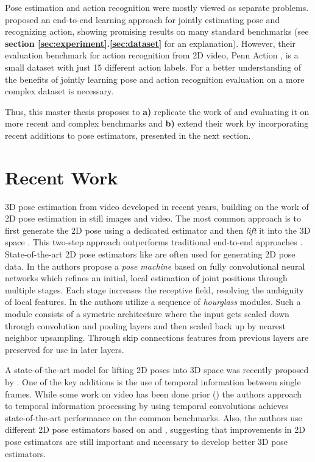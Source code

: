 \documentclass[twoside]{article}
\begin{document}
\begin{multicols}{2}
Pose estimation and action recognition were mostly viewed as separate problems.
\cite{luvizon_2d/3d_2018} proposed an end-to-end learning approach for jointly estimating pose and recognizing action, showing promising results on many standard benchmarks (see \textbf{section \ref{sec:experiment}.\ref{sec:dataset}} for an explanation).
However, their evaluation benchmark for action recognition from 2D video, Penn Action \cite{zhang_actemes_2013}, is a small dataset with just 15 different action labels.
For a better understanding of the benefits of jointly learning pose and action recognition evaluation on a more complex dataset is necessary.

Thus, this master thesis proposes to \textbf{a)} replicate the work of \cite{luvizon_2d/3d_2018} and evaluating it on more recent and complex benchmarks and \textbf{b)} extend their work by incorporating recent additions to pose estimators, presented in the next section.

\section{Recent Work}
\label{sec:recent}
3D pose estimation from video developed in recent years, building on the work of 2D pose estimation in still images and video.
The most common approach is to first generate the 2D pose using a dedicated estimator and then \textit{lift} it into the 3D space \cite{pavllo_3d_2019}\cite{martinez_simple_2017}.
This two-step approach outperforms traditional end-to-end approaches \cite{pavllo_3d_2019}.
State-of-the-art 2D pose estimators like \cite{newell_stacked_2016}\cite{wei_convolutional_2016} are often used for generating 2D pose data.
In \cite{wei_convolutional_2016} the authors propose a \textit{pose machine} based on fully convolutional neural networks which refines an initial, local estimation of joint positions through multiple stages.
Each stage increases the receptive field, resolving the ambiguity of local features.
In \cite{newell_stacked_2016} the authors utilize a sequence of \textit{hourglass} modules.
Such a module consists of a symetric architecture where the input gets scaled down through convolution and pooling layers and then scaled back up by nearest neighbor upsampling.
Through skip connections features from previous layers are preserved for use in later layers.

A state-of-the-art model for lifting 2D poses into 3D space was recently proposed by \cite{pavllo_3d_2019}.
One of the key additions is the use of temporal information between single frames.
While some work on video has been done prior (\cite{lin_recurrent_2017}\cite{hossain_exploiting_2018}) the authors approach to temporal information processing by using temporal convolutions achieves state-of-the-art performance on the common benchmarks. 
Also, the authors use different 2D pose estimators based on \cite{he_mask_2017} and \cite{chen_cascaded_2018}, suggesting that improvements in 2D pose estimators are still important and necessary to develop better 3D pose estimators.


\end{multicols}
\end{document}
